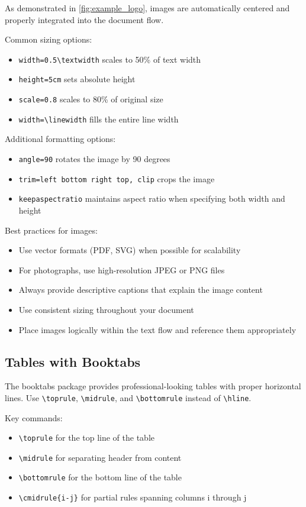 As demonstrated in \cref{fig:example_logo}, images are automatically centered and properly integrated into the document flow.

Common sizing options:
\begin{itemize}
    \item \verb+width=0.5\textwidth+ scales to 50\% of text width
    \item \verb+height=5cm+ sets absolute height
    \item \verb+scale=0.8+ scales to 80\% of original size
    \item \verb+width=\linewidth+ fills the entire line width
\end{itemize}

Additional formatting options:
\begin{itemize}
    \item \verb+angle=90+ rotates the image by 90 degrees
    \item \verb+trim=left bottom right top, clip+ crops the image
    \item \verb+keepaspectratio+ maintains aspect ratio when specifying both width and height
\end{itemize}

Best practices for images:
\begin{itemize}
    \item Use vector formats (PDF, SVG) when possible for scalability
    \item For photographs, use high-resolution JPEG or PNG files
    \item Always provide descriptive captions that explain the image content
    \item Use consistent sizing throughout your document
    \item Place images logically within the text flow and reference them appropriately
\end{itemize}

\subsection{Tables with Booktabs}

The booktabs package provides professional-looking tables with proper horizontal lines. Use \verb+\toprule+, \verb+\midrule+, and \verb+\bottomrule+ instead of \verb+\hline+.

Key commands:
\begin{itemize}
    \item \verb+\toprule+ for the top line of the table
    \item \verb+\midrule+ for separating header from content
    \item \verb+\bottomrule+ for the bottom line of the table
    \item \verb+\cmidrule{i-j}+ for partial rules spanning columns i through j
\end{itemize}

